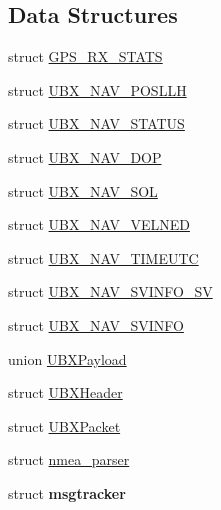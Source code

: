 \subsection*{Data Structures}
\begin{DoxyCompactItemize}
\item 
struct \hyperlink{struct_g_p_s___r_x___s_t_a_t_s}{G\-P\-S\-\_\-\-R\-X\-\_\-\-S\-T\-A\-T\-S}
\item 
struct \hyperlink{struct_u_b_x___n_a_v___p_o_s_l_l_h}{U\-B\-X\-\_\-\-N\-A\-V\-\_\-\-P\-O\-S\-L\-L\-H}
\item 
struct \hyperlink{struct_u_b_x___n_a_v___s_t_a_t_u_s}{U\-B\-X\-\_\-\-N\-A\-V\-\_\-\-S\-T\-A\-T\-U\-S}
\item 
struct \hyperlink{struct_u_b_x___n_a_v___d_o_p}{U\-B\-X\-\_\-\-N\-A\-V\-\_\-\-D\-O\-P}
\item 
struct \hyperlink{struct_u_b_x___n_a_v___s_o_l}{U\-B\-X\-\_\-\-N\-A\-V\-\_\-\-S\-O\-L}
\item 
struct \hyperlink{struct_u_b_x___n_a_v___v_e_l_n_e_d}{U\-B\-X\-\_\-\-N\-A\-V\-\_\-\-V\-E\-L\-N\-E\-D}
\item 
struct \hyperlink{struct_u_b_x___n_a_v___t_i_m_e_u_t_c}{U\-B\-X\-\_\-\-N\-A\-V\-\_\-\-T\-I\-M\-E\-U\-T\-C}
\item 
struct \hyperlink{struct_u_b_x___n_a_v___s_v_i_n_f_o___s_v}{U\-B\-X\-\_\-\-N\-A\-V\-\_\-\-S\-V\-I\-N\-F\-O\-\_\-\-S\-V}
\item 
struct \hyperlink{struct_u_b_x___n_a_v___s_v_i_n_f_o}{U\-B\-X\-\_\-\-N\-A\-V\-\_\-\-S\-V\-I\-N\-F\-O}
\item 
union \hyperlink{union_u_b_x_payload}{U\-B\-X\-Payload}
\item 
struct \hyperlink{struct_u_b_x_header}{U\-B\-X\-Header}
\item 
struct \hyperlink{struct_u_b_x_packet}{U\-B\-X\-Packet}
\item 
struct \hyperlink{structnmea__parser}{nmea\-\_\-parser}
\item 
struct {\bfseries msgtracker}
\end{DoxyCompactItemize}
